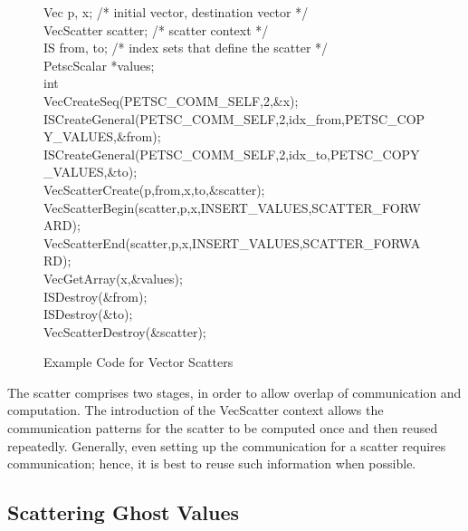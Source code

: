 \begin{figure}[tb]
\begin{tabbing}
   Vec         p, x;         /* initial vector, destination vector */\\
   VecScatter  scatter;      /* scatter context */\\
   IS          from, to;     /* index sets that define the scatter */\\
   PetscScalar *values;\\
   int         \\

   VecCreateSeq(PETSC_COMM_SELF,2,\&x);\\
   ISCreateGeneral(PETSC_COMM_SELF,2,idx\_from,PETSC\_COPY\_VALUES,\&from);\\
   ISCreateGeneral(PETSC_COMM_SELF,2,idx\_to,PETSC\_COPY\_VALUES,\&to);\\
   VecScatterCreate(p,from,x,to,\&scatter);\\
   VecScatterBegin(scatter,p,x,INSERT_VALUES,SCATTER_FORWARD);\\
   VecScatterEnd(scatter,p,x,INSERT_VALUES,SCATTER_FORWARD);\\
   VecGetArray(x,\&values);\\
   ISDestroy(\&from);\\
   ISDestroy(\&to); \\
   VecScatterDestroy(\&scatter);
\end{tabbing}
\caption{Example Code for Vector Scatters}
\label{fig_vecscatter}
\end{figure}

The scatter comprises two stages, in order to allow overlap of 
communication and computation. The introduction of the 
VecScatter context allows the communication patterns for the scatter
to be computed once and then reused repeatedly. Generally, even 
setting up the communication for a scatter requires communication; 
hence, it is best to reuse such information when possible.

\subsection{Scattering Ghost Values}

